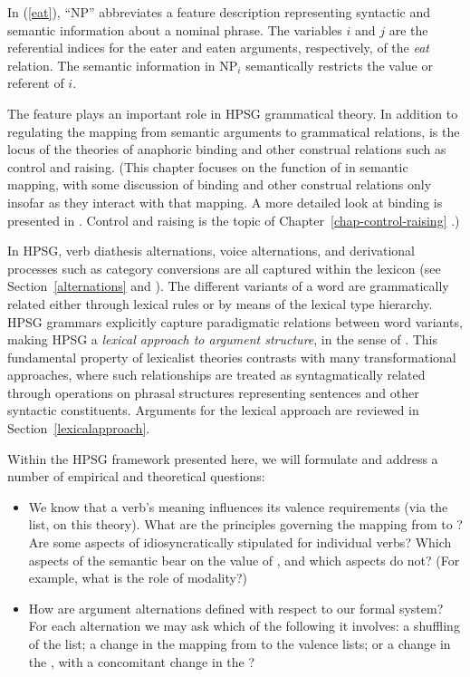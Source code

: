 \documentclass[output=paper,biblatex,babelshorthands,newtxmath,draftmode,colorlinks, citecolor=brown]{langscibook}
\begin{document}
	
\noindent
In (\ref{eat}), ``NP'' abbreviates a feature description representing syntactic and semantic information about a nominal phrase.  The variables $i$ and 
$j$ are the referential indices for the eater and eaten arguments, respectively, of the \textit{eat} relation.  The semantic information in 
NP$_i$ semantically restricts the value or referent of $i$. 

The \argst feature plays an important  
role in HPSG grammatical theory.  In addition to regulating the mapping from semantic arguments to
grammatical relations, \argst is the locus of the theories of anaphoric binding and other construal
relations such as control and raising.  (This chapter focuses on the function of \argst  in semantic
mapping, with some discussion of binding and other construal relations only insofar as they interact
with that mapping.  A more detailed look at binding is presented in
. Control and raising is the topic of Chapter~\ref{chap-control-raising} \citep{chapters/control-raising}.)   

\largerpage
In HPSG, verb diathesis alternations, voice alternations, and derivational processes such as category conversions are all captured within the lexicon (see Section~\ref{alternations} and ).  The different variants of a word are grammatically related either through lexical rules or by means of the lexical type hierarchy.  HPSG grammars explicitly capture paradigmatic relations between word variants, making HPSG a \textit{lexical approach to argument structure}, in the sense of \citet{MWArgSt}.
This fundamental property of lexicalist theories contrasts with many transformational approaches, where such relationships are treated as syntagmatically related through operations on phrasal structures representing sentences and other syntactic constituents.  Arguments for the lexical approach are reviewed in Section~\ref{lexicalapproach}.  

Within the HPSG framework presented here, we will formulate and address a number of empirical and theoretical questions: 

\begin{itemize}
\item We know that a verb's meaning influences its valence requirements (via the \argst list, on this theory). 
 What are the principles governing the mapping from \content to \argst?  Are some aspects of \argst idiosyncratically stipulated for individual verbs?  Which aspects of the semantic \content  bear on the value of \argst, and which aspects do not?  (For example, what is the role of modality?)  
\item How are argument alternations defined with respect to our formal system?  For each alternation
  we may ask which of the following it involves: a shuffling of the \argst list;  a change in the
  mapping from \argst to the valence lists; or  a change in the \content, with a concomitant change in the \argst?  
\end{itemize}
\end{document}

